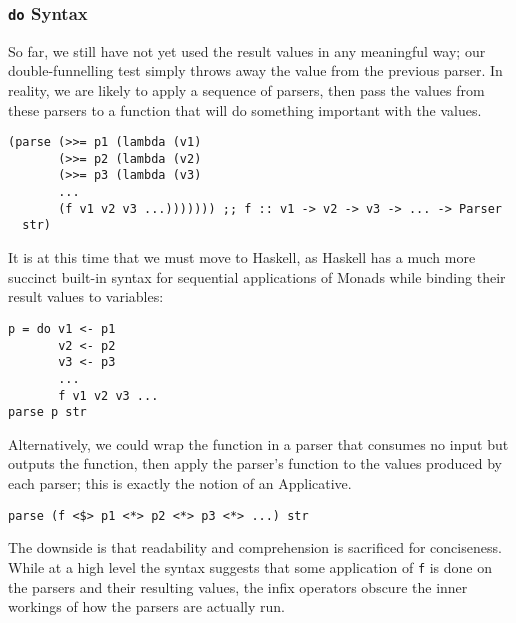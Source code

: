 \subsubsection{\texttt{do} Syntax}\label{do-syntax}
So far, we still have not yet used the result values in any meaningful way; our double-funnelling test simply throws away the value from the previous parser. In reality, we are likely to apply a sequence of parsers, then pass the values from these parsers to a function that will do something important with the values.
\begin{verbatim}
(parse (>>= p1 (lambda (v1)
       (>>= p2 (lambda (v2)
       (>>= p3 (lambda (v3)
       ...
       (f v1 v2 v3 ...))))))) ;; f :: v1 -> v2 -> v3 -> ... -> Parser
  str)
\end{verbatim}
It is at this time that we must move to Haskell, as Haskell has a much more succinct built-in syntax for sequential applications of Monads while binding their result values to variables:
\begin{verbatim}
p = do v1 <- p1
       v2 <- p2
       v3 <- p3
       ...
       f v1 v2 v3 ...
parse p str
\end{verbatim}
Alternatively, we could wrap the function in a parser that consumes no input but outputs the function, then apply the parser's function to the values produced by each parser; this is exactly the notion of an Applicative.
\begin{verbatim}
parse (f <$> p1 <*> p2 <*> p3 <*> ...) str
\end{verbatim}
The downside is that readability and comprehension is sacrificed for conciseness. While at a high level the syntax suggests that some application of \texttt{f} is done on the parsers and their resulting values, the infix operators obscure the inner workings of how the parsers are actually run.